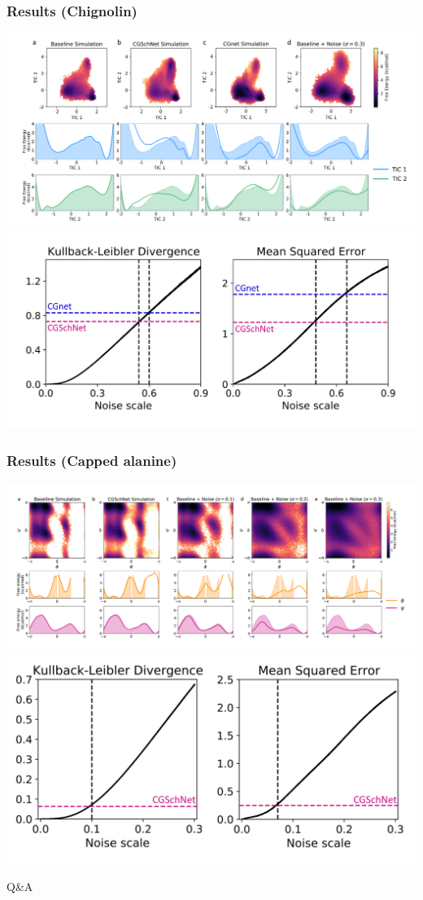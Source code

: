 \documentclass{beamer}
\begin{document}
\begin{frame}
  \frametitle{Results (Chignolin)}
  \begin{center}
    \includegraphics[width=0.6\linewidth]{./chignolin_results.png}
    \includegraphics[width=0.6\linewidth]{./chignolin_divergence.png}
  \end{center}
\end{frame}
\begin{frame}
  \frametitle{Results (Capped alanine)}
  \begin{center}
    \includegraphics[width=0.6\linewidth]{./alanine_results.png}
    \includegraphics[width=0.6\linewidth]{./alanine_divergence.png}
  \end{center}
\end{frame}
\begin{frame}
  \begin{center}
    \Huge Q\&A
  \end{center}
\end{frame}
\end{document}
